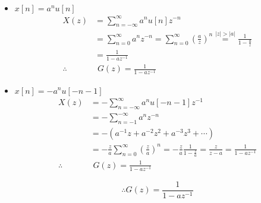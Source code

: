 \begin{enumerate}
            \begin{itemize}
                \item $x[n] = a^n u[n]$
                    \begin{equation}
                        \begin{split}
                            X(z) &= \sum_{n = -\infty}^{\infty} a^n u[n] z^{-n} \\
                            & = \sum_{n 
                            = 0}^{\infty} a^n z^{-n} = \sum_{n = 0}^{\infty} (\frac{a}{z})^n \stackrel{|z| > |a|}{=} \frac{1}{1 - \frac{a}{z}} \\
                            &= \frac{1}{1 - a z^{-1}} \\
                            \therefore & \,\, G(z) = \frac{1}{1 - a z^{-1}}
                        \end{split}
                    \end{equation}
                
                \item $x[n] = -a^n u[-n-1]$
                    \begin{equation}
                        \begin{split}
                            X(z) &= - \sum_{n = - \infty}^{\infty} a^n u[-n - 1] z^{-1} \\
                            &= - \sum_{n = -1}^{-\infty} a^n z^{-n} \\
                            &= -\left(a^{-1}z + a^{-2} z^2 + a^{-3} z^3 + \cdots\right) \\
                            &= -\frac{z}{a} \sum_{n = 0}^{\infty} (\frac{z}{a})^n = - \frac{z}{a} \frac{1}{1 - \frac{z}{a}} = \frac{z}{z-a} = \frac{1}{1 - a z^{-1}} \\
                            \therefore & \,\, G(z) = \frac{1}{1 - a z^{-1}}
                        \end{split}
                    \end{equation}
                    
                    \begin{equation}
                        \therefore G(z) = \frac{1}{1 - a z^{-1}}
                    \end{equation}
            \end{itemize}
        \end{enumerate}